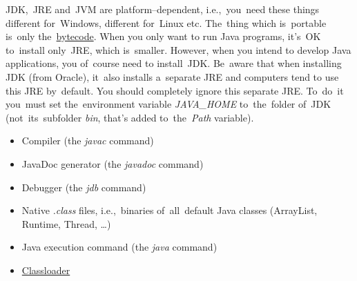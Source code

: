 \noindent JDK,~JRE and~JVM are platform--dependent, i.e.,~you~need these things different for~Windows, different for~Linux etc. The~thing which is~portable is~only the~\hyperref[bytecode]{bytecode}. When you only want to run Java programs, it's~OK to~install only~JRE, which is~smaller. However, when you intend to develop Java applications, you of~course need to install~JDK. Be~aware that when installing JDK (from Oracle), it~also installs a~separate JRE and computers tend to use this JRE by~default. You should completely ignore this separate JRE. To~do~it you~must set the~environment variable \textit{JAVA\_HOME} to~the~folder of~JDK (not~its~subfolder \textit{bin}, that's added to~the~\textit{Path} variable).

\begin{itemize}
    \item Compiler (the \textit{javac} command)
    \item JavaDoc generator (the \textit{javadoc} command)
    \item Debugger (the \textit{jdb} command)
\end{itemize}

\begin{itemize}
    \item Native \textit{.class} files, i.e.,~binaries of~all~default Java classes (ArrayList, Runtime, Thread, \dots)
    \item Java execution command (the \textit{java} command)
    \item \hyperref[classloaders]{Classloader}
\end{itemize}


\label{accessmodifiers}

\label{serialization}

